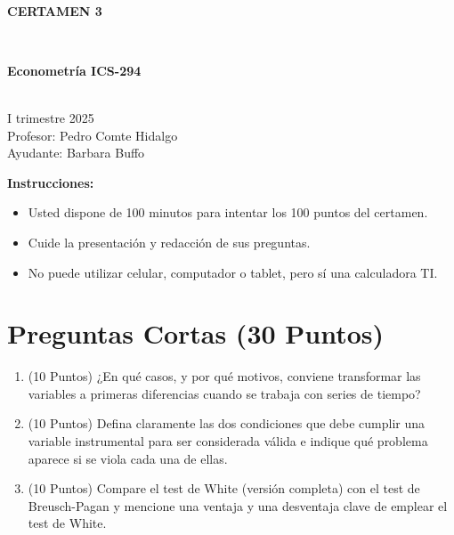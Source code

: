 \documentclass[10pt,a4paper]{article}
\begin{document}
\vspace{5cm}



\begin{center}
\begin{large}
\textbf{\\CERTAMEN 3}
\end{large}\\
\end{center}

\begin{center}
\begin{large}
\textbf{Econometría ICS-294}
\end{large}\\
\vspace{0.2cm}
I trimestre 2025\\
Profesor: Pedro Comte Hidalgo\\
Ayudante: Barbara Buffo
\end{center}

\textbf{Instrucciones:} 

\begin{itemize}

    \item Usted dispone de 100 minutos  para intentar los 100 puntos del certamen.
    \item Cuide la presentación y redacción de sus preguntas.
    \item No puede utilizar celular, computador o tablet, pero sí una calculadora TI.
     
\end{itemize}

\section{Preguntas Cortas (30 Puntos)}

\begin{enumerate}

\item (10 Puntos) ¿En qué casos, y por qué motivos, conviene transformar las variables a primeras diferencias cuando se trabaja con series de tiempo?

\item (10 Puntos) Defina claramente las dos condiciones que debe cumplir una variable instrumental para ser considerada válida e indique qué problema aparece si se viola cada una de ellas.  
\item (10 Puntos) Compare el test de White (versión completa) con el test de Breusch-Pagan y mencione una ventaja y una desventaja clave de emplear el test de White.

\end{enumerate}
\end{document}
